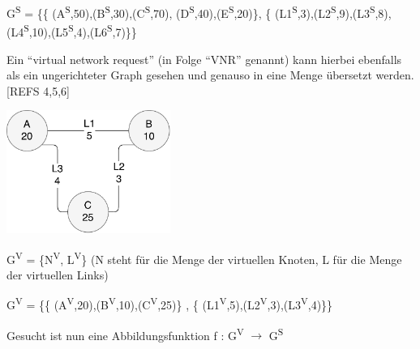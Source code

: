 \documentclass{lni}
\begin{document}
\begin{center}
G\textsuperscript{S} = 
\{\{
(A\textsuperscript{S},50),(B\textsuperscript{S},30),(C\textsuperscript{S},70),
(D\textsuperscript{S},40),(E\textsuperscript{S},20)\},
\newline\{
(L1\textsuperscript{S},3),(L2\textsuperscript{S},9),(L3\textsuperscript{S},8),
(L4\textsuperscript{S},10),(L5\textsuperscript{S},4),(L6\textsuperscript{S},7)\}\}
\end{center}




Ein "`virtual network request"' (in Folge "`VNR"' genannt) kann hierbei ebenfalls als ein ungerichteter Graph gesehen und genauso in eine Menge übersetzt werden. [REFS 4,5,6]

\begin{center}
	\includegraphics[width=0.4\textwidth]{VNR1.pdf}\newline
\end{center}

\begin{center}
G\textsuperscript{V} = \{N\textsuperscript{V}, L\textsuperscript{V}\}\newline
(N steht für die Menge der virtuellen Knoten, L für die Menge der virtuellen Links)
\end{center}

\begin{center}
G\textsuperscript{V} = \{\{
(A\textsuperscript{V},20),(B\textsuperscript{V},10),(C\textsuperscript{V},25)\} , \{
(L1\textsuperscript{V},5),(L2\textsuperscript{V},3),(L3\textsuperscript{V},4)\}\}
\end{center}

\begin{center}
Gesucht ist nun eine Abbildungsfunktion f : G\textsuperscript{V} $\rightarrow$ G\textsuperscript{S}
\end{center}
\end{document}
